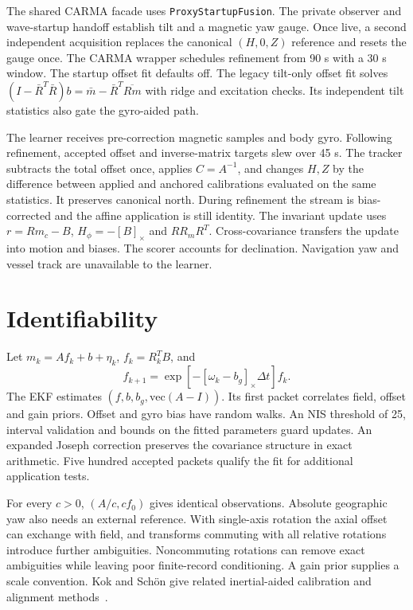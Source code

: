 \documentclass[conference]{IEEEtran}
\newcommand{\sk}[1]{[#1]_{\times}}
\begin{document}
The shared CARMA facade uses \texttt{ProxyStartupFusion}. The private observer and wave-startup handoff establish tilt and a magnetic yaw gauge. Once live, a second independent acquisition replaces the canonical $(H,0,Z)$ reference and resets the gauge once. The CARMA wrapper schedules refinement from 90 s with a 30 s window. The startup offset fit defaults off. The legacy tilt-only offset fit solves $(I-\bar R^T\bar R)b=\bar m-\bar R^T\overline{Rm}$ with ridge and excitation checks. Its independent tilt statistics also gate the gyro-aided path.

The learner receives pre-correction magnetic samples and body gyro. Following refinement, accepted offset and inverse-matrix targets slew over 45 s. The tracker subtracts the total offset once, applies $C=A^{-1}$, and changes $H,Z$ by the difference between applied and anchored calibrations evaluated on the same statistics. It preserves canonical north. During refinement the stream is bias-corrected and the affine application is still identity. The invariant update uses $r=Rm_c-B$, $H_\phi=-\sk B$ and $R R_m R^T$. Cross-covariance transfers the update into motion and biases. The scorer accounts for declination. Navigation yaw and vessel track are unavailable to the learner.

\section{Identifiability}
Let $m_k=A f_k+b+\eta_k$, $f_k=R_k^T B$, and
\[
 f_{k+1}=\exp[-\sk{\omega_k-b_g}\Delta t]f_k .
\]
The EKF estimates $(f,b,b_g,\mathrm{vec}(A-I))$. Its first packet correlates field, offset and gain priors. Offset and gyro bias have random walks. An NIS threshold of 25, interval validation and bounds on the fitted parameters guard updates. An expanded Joseph correction preserves the covariance structure in exact arithmetic. Five hundred accepted packets qualify the fit for additional application tests.

For every $c>0$, $(A/c,cf_0)$ gives identical observations. Absolute geographic yaw also needs an external reference. With single-axis rotation the axial offset can exchange with field, and transforms commuting with all relative rotations introduce further ambiguities. Noncommuting rotations can remove exact ambiguities while leaving poor finite-record conditioning. A gain prior supplies a scale convention. Kok and Sch\"on give related inertial-aided calibration and alignment methods~\cite{kok}.
\end{document}
